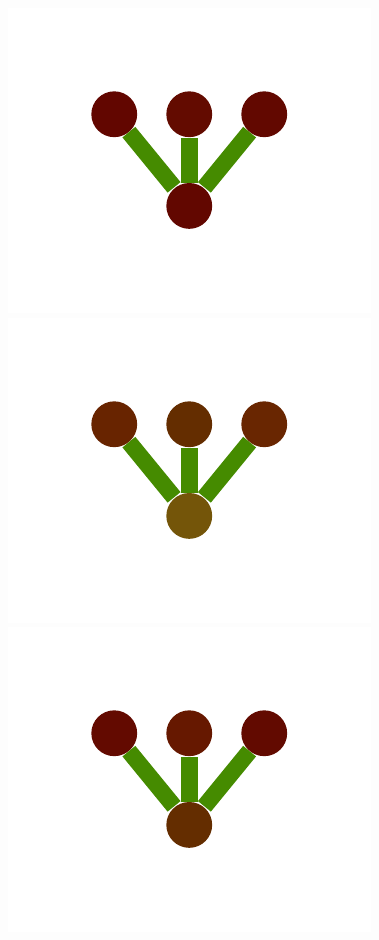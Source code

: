 \documentclass[a4paper,10pt]{article}
\begin{document}
\begin{figure}
{    \includegraphics[scale=.2]{./figures/6-1-single-color-flower-data-6.pdf}
    \includegraphics[scale=.2]{./figures/6-1-single-color-flower-data-7.pdf}
    \includegraphics[scale=.2]{./figures/6-1-single-color-flower-data-8.pdf}
    \label{fig:exp-single-flower-data}
    }
\end{figure}
\end{document}
